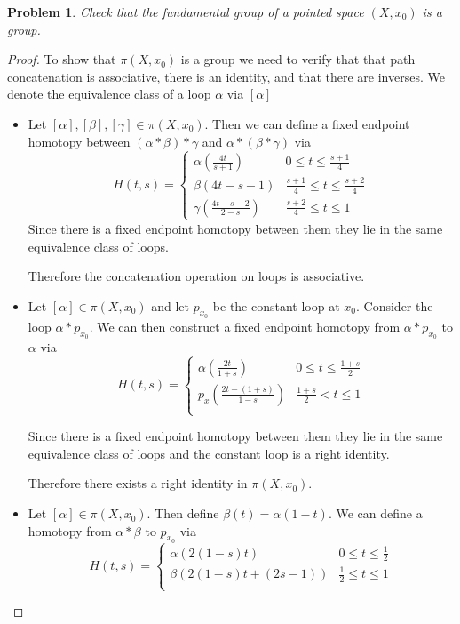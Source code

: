 \documentclass[10pt]{article}
\newcommand{\sk}{\vskip 10mm}
\theoremstyle{plain}
\newtheorem{problem}{Problem}
\theoremstyle{remark}
\begin{document}
\sk

\begin{problem} %
  Check that the fundamental group of a pointed space $(X,x_0)$ is a group.
\end{problem}

\begin{proof} To show that $\pi(X,x_0)$ is a group we need to verify that
  that path concatenation is associative, there is an identity, and that there are inverses.
  We denote the equivalence class of a loop $\alpha$ via $[\alpha]$
  \begin{itemize}
  \item Let $[\alpha],[\beta],[\gamma]\in\pi(X,x_0)$. Then we can define a fixed endpoint
    homotopy between $(\alpha*\beta)*\gamma$ and $\alpha*(\beta*\gamma)$ via
    \[
      H(t,s) = \left\{
        \begin{array}{cc}
          \alpha(\frac{4t}{s+1}) & 0\leq t \leq \frac{s+1}{4}\\
          \beta(4t-s-1) & \frac{s+1}{4}\leq t\leq \frac{s+2}{4}\\
          \gamma(\frac{4t-s-2}{2-s}) & \frac{s+2}{4} \leq t \leq 1
        \end{array}
      \right. 
    \]
    Since there is a fixed endpoint homotopy between them they lie in the same
    equivalence class of loops.

    Therefore the concatenation operation on loops is associative.
  \item Let $[\alpha]\in\pi(X,x_0)$ and let $p_{x_0}$ be the constant loop at $x_0$.
    Consider the loop $\alpha*p_{x_0}$. We can then construct a fixed endpoint homotopy from
    $\alpha*p_{x_0}$ to $\alpha$ via 
    \[
      H(t,s)=\left\{
        \begin{array}{cc}
          \alpha(\frac{2t}{1+s}) & 0 \leq t \leq \frac{1+s}{2}\\
          p_x(\frac{2t-(1+s)}{1-s}) & \frac{1+s}{2}< t\leq 1\\
        \end{array}
      \right.
    \]

    Since there is a fixed endpoint homotopy between them they lie in the same equivalence
    class of loops and the constant loop is a right identity.
    
    Therefore there exists a right identity in $\pi(X,x_0)$.
  \item Let $[\alpha]\in\pi(X,x_0)$. Then define $\beta(t)=\alpha(1-t)$. We can define
    a homotopy from $\alpha*\beta$ to $p_{x_0}$ via
    \[
      H(t,s) = \left\{
        \begin{array}{cc}
          \alpha(2(1-s)t) & 0 \leq t \leq \frac{1}{2}\\
          \beta(2(1-s)t+(2s-1)) & \frac{1}{2}\leq t\leq 1\\                            
        \end{array}
      \right.
    \]


\end{itemize}
\end{proof}
\end{document}
